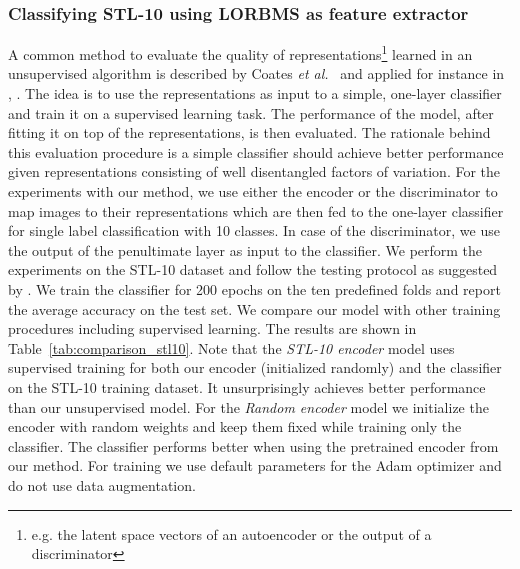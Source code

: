 \documentclass[12pt,a4paper]{article}
\begin{document}
\subsubsection{Classifying STL-10 using LORBMS as feature extractor}\label{subsec:linearclassifier}
A common method to evaluate the quality of representations\footnote{e.g. the latent space vectors of an autoencoder or the output of a discriminator} learned in an unsupervised algorithm is described by Coates \textit{et al.}~\cite{singleLayerNetworks} and applied for instance in \cite{DCGAN}, \cite{AE_Interp} . The idea is to use the representations as input to a simple, one-layer classifier and train it on a supervised learning task. The performance of the model, after fitting it on top of the representations, is then evaluated. The rationale behind this evaluation procedure is a simple classifier should achieve better performance given representations consisting of well disentangled factors of variation. For the experiments with our method, we use either the encoder or the discriminator to map images to their representations which are then fed to the one-layer classifier for single label classification with 10 classes. In case of the discriminator, we use the output of the penultimate layer as input to the classifier. We perform the experiments on the STL-10 dataset and follow the testing protocol as suggested by \cite{singleLayerNetworks}. We train the classifier for 200 epochs on the ten predefined folds and report the average accuracy on the test set. We compare our model with other training procedures including supervised learning. The results are shown in Table~\ref{tab:comparison_stl10}. Note that the \textit{STL-10 encoder} model uses supervised training for both our encoder (initialized randomly) and the classifier on the STL-10 training dataset. It unsurprisingly achieves better performance than our unsupervised model. For the \textit{Random encoder} model we initialize the encoder with random weights and keep them fixed while training only the classifier. The classifier performs better when using the pretrained encoder from our method. For training we use default parameters for the Adam optimizer and do not use data augmentation.
\end{document}
